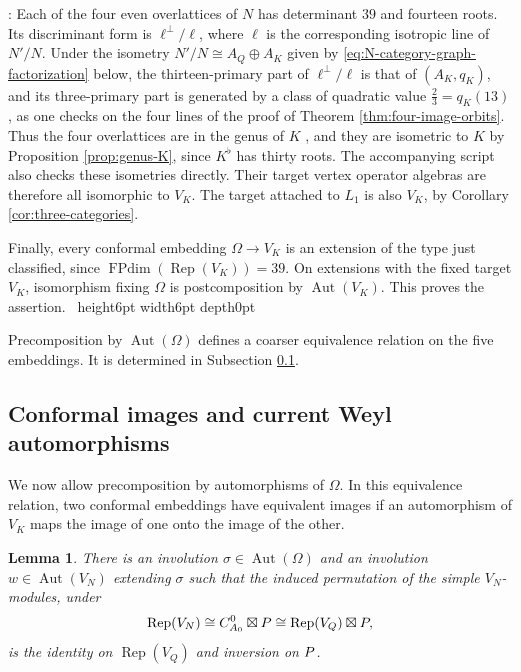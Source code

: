 \documentclass[leqno]{article}
\let\cal\relax
\newcommand{\cal}{\mathcal}
\newcommand{\qed}{\hfill \vrule height6pt  width6pt depth0pt}
\DeclareMathOperator{\Rep}{Rep}
\newtheorem{lemma}[thm]{Lemma}
\newenvironment{proof}[1][]{\noindent {\it Proof #1} : }{\hbox{~}\qed
\smallskip
}
\numberwithin{equation}{section}
\begin{document}
\begin{proof}
Each of the four even overlattices of $N$ has determinant $39$ and fourteen roots. Its discriminant form is $\ell^\perp/\ell$, where $\ell$ is the corresponding isotropic line of $N'/N$. Under the isometry $N'/N \cong A_Q \oplus A_K$ given by \eqref{eq:N-category-graph-factorization} below, the thirteen-primary part of $\ell^\perp/\ell$ is that of $(A_K,q_K)$, and its three-primary part is generated by a class of quadratic value $\frac23 = q_K(13)$, as one checks on the four lines of the proof of Theorem \ref{thm:four-image-orbits}. Thus the four overlattices are in the genus of $K$ \cite[Corollary 1.9.4]{Nik80}, and they are isometric to $K$ by Proposition \ref{prop:genus-K}, since $K^\flat$ has thirty roots. The accompanying script also checks these isometries directly. Their target vertex operator algebras are therefore all isomorphic to $V_K$. The target attached to $L_1$ is also $V_K$, by Corollary \ref{cor:three-categories}.

Finally, every conformal embedding $\Omega \to V_K$ is an extension of the type just classified, since $\operatorname{FPdim}(\Rep(V_K)) = 39$. On extensions with the fixed target $V_K$, isomorphism fixing $\Omega$ is postcomposition by $\operatorname{Aut}(V_K)$. This proves the assertion.
\end{proof}

Precomposition by $\operatorname{Aut}(\Omega)$ defines a coarser equivalence relation on the five embeddings. It is determined in Subsection \ref{subsec:four-conformal-images}.

\subsection{Conformal images and current Weyl automorphisms}
\label{subsec:four-conformal-images}

We now allow precomposition by automorphisms of $\Omega$. In this equivalence relation, two conformal embeddings have equivalent images if an automorphism of $V_K$ maps the image of one onto the image of the other.

\begin{lemma}
\label{lem:weyl-action-on-N-modules}
There is an involution $\sigma \in \operatorname{Aut}(\Omega)$ and an involution $w \in \operatorname{Aut}(V_N)$ extending $\sigma$ such that the induced permutation of the simple $V_N$-modules, under
\begin{equation}
\label{eq:N-category-graph-factorization}
\Rep(V_N) \cong \cal C_{A_0}^0\boxtimes\cal P \cong \Rep(V_Q)\boxtimes\cal P,
\end{equation}
is the identity on $\Rep(V_Q)$ and inversion on $\cal P$.
\end{lemma}
\end{document}
